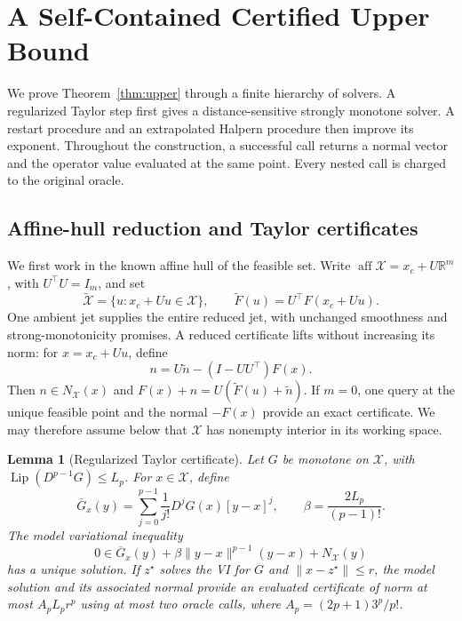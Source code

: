 \documentclass[11pt]{article}
\numberwithin{equation}{section}
\newtheorem{lemma}[theorem]{Lemma}
\theoremstyle{definition}
\theoremstyle{remark}
\begin{document}
\section{A Self-Contained Certified Upper Bound}\label{sec:upper}
We prove Theorem~\ref{thm:upper} through a finite hierarchy of solvers.
A regularized Taylor step first gives a distance-sensitive strongly
monotone solver. A restart procedure and an extrapolated Halpern procedure
then improve its exponent. Throughout the construction, a successful call
returns a normal vector and the operator value evaluated at the same
point. Every nested call is charged to the original oracle.

\subsection{Affine-hull reduction and Taylor certificates}

We first work in the known affine hull of the feasible set. Write
\(\operatorname{aff}\mathcal X=x_c+U\mathbb R^m\), with
\(U^\top U=I_m\), and set
\[
\widetilde{\mathcal X}=\{u:x_c+Uu\in\mathcal X\},
\qquad
\widetilde F(u)=U^\top F(x_c+Uu).
\]
One ambient jet supplies the entire reduced jet, with unchanged
smoothness and strong-monotonicity promises. A reduced certificate lifts
without increasing its norm: for \(x=x_c+Uu\), define
\[
n=U\widetilde n-(I-UU^\top)F(x).
\]
Then \(n\in N_{\mathcal X}(x)\) and
\(F(x)+n=U(\widetilde F(u)+\widetilde n)\).
If \(m=0\), one query at the unique feasible point and the normal
\(-F(x)\) provide an exact certificate. We may therefore assume below
that \(\mathcal X\) has nonempty interior in its working space.

\begin{lemma}[Regularized Taylor certificate]\label{lem:taylor-certificate}
Let \(G\) be monotone on \(\mathcal X\), with
\(\operatorname{Lip}(D^{p-1}G)\le L_p\). For \(x\in\mathcal X\), define
\[
\overline G_x(y)=\sum_{j=0}^{p-1}\frac{1}{j!}D^jG(x)[y-x]^j,
\qquad \beta=\frac{2L_p}{(p-1)!}.
\]
The model variational inequality
\begin{equation}\label{eq:taylor-model}
0\in\overline G_x(y)+\beta\|y-x\|^{p-1}(y-x)
       +N_{\mathcal X}(y)
\end{equation}
has a unique solution. If \(z^\star\) solves the VI for \(G\) and
\(\|x-z^\star\|\le r\), the model solution and its associated normal
provide an evaluated certificate of norm at most \(A_pL_pr^p\) using
at most two oracle calls, where
\(A_p=(2p+1)3^p/p!\).
\end{lemma}
\end{document}
